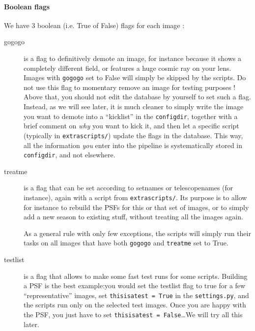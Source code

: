 \paragraph{Boolean flags}

We have 3 boolean (i.e. True of False) flags for each image :

\begin{description}

\item[gogogo] is a flag to definitively demote an image, for instance because it shows a completely different field, or features a huge cosmic ray on your lens. Images with \verb+gogogo+ set to False will simply be skipped by the scripts. Do not use this flag to momentary remove an image for testing purposes ! Above that, you should not edit the database by yourself to set such a flag. Instead, as we will see later, it is much cleaner to simply write the image you want to demote into a ``kicklist'' in the \verb+configdir+, together with a brief comment on \emph{why} you want to kick it, and then let a specific script (typically in \verb+extrascripts/+) update the flags in the database. This way, all the information \emph{you} enter into the pipeline is systematically stored in \verb+configdir+, and not elsewhere.

\item[treatme] is a flag that can be set according to setnames or telescopenames (for instance), again with a script from \verb+extrascripts/+. Its purpose is to allow for instance to rebuild the PSFs for this or that set of images, or to simply add a new season to existing stuff, without treating all the images again.

As a general rule with only few exceptions, the scripts will simply run their tasks on all images that have both \verb+gogogo+ and \verb+treatme+ set to True.

\item[testlist] is a flag that allows to make some fast test runs for some scripts. Building a PSF is the best example:you would set the testlist flag to true for a few ``representative'' images, set \verb+thisisatest = True+ in the \verb+settings.py+, and the scripts run only on the selected test images. Once you are happy with the PSF, you just have to set  \verb+thisisatest = False+\ldots We will try all this later.

\end{description}


